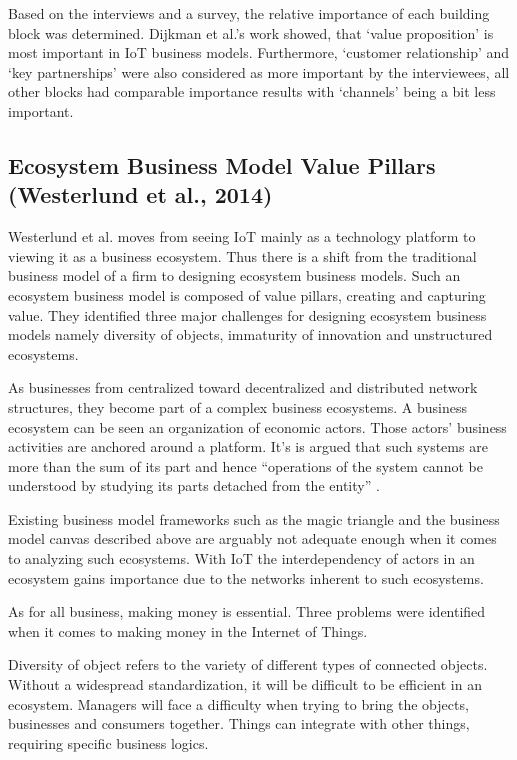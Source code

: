 		Based on the interviews and a survey, the relative importance of each building block was determined. Dijkman et al.'s work showed, that `value proposition' is most important in IoT business models. Furthermore, `customer relationship' and `key  partnerships' were also considered as more important by the interviewees, all other blocks had comparable importance results with  `channels' being a bit less important.\\    
		

	\subsection{Ecosystem Business Model Value Pillars (Westerlund et al., 2014)}
		Westerlund et al. moves from seeing IoT mainly as a technology platform to viewing it as a business ecosystem. Thus there is a shift from the traditional business model of a firm to designing ecosystem business models. Such an ecosystem business model is composed of value pillars, creating and capturing value. They identified three major challenges for designing ecosystem business models namely diversity of objects, immaturity of innovation and unstructured ecosystems.

		As businesses from centralized toward decentralized and distributed network structures, they become part of a complex business ecosystems. A business ecosystem can be seen an organization of economic actors. Those actors' business activities are anchored around a platform. It's is argued that such systems are more than the sum of its part and hence ``operations of the system cannot be understood by studying its parts detached from the entity'' \cite{westerlund}.

		Existing business model frameworks such as the magic triangle and the business model canvas described above are arguably not adequate enough when it comes to analyzing such ecosystems. With IoT the interdependency of actors in an ecosystem gains importance due to the networks inherent to such ecosystems.

		As for all business, making money is essential. Three problems were identified  when it comes to making money in the Internet of Things.

		Diversity of object refers to the variety of different types of connected objects. Without a widespread standardization, it will be difficult to be efficient in an ecosystem. Managers will face a difficulty when trying to bring the objects, businesses and consumers together. Things can integrate with other things, requiring specific business logics.

